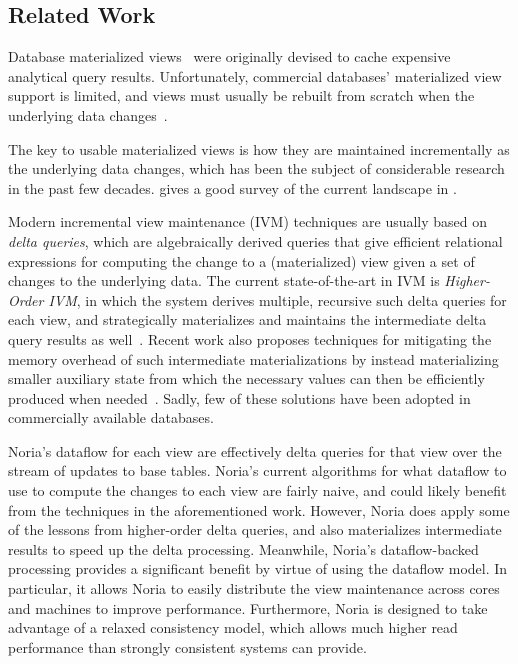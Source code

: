 \subsection*{Related Work}

Database materialized views~\cite{gupta-view-selection,lee} were originally
devised to cache expensive analytical query results. Unfortunately, commercial
databases' materialized view support is limited, and views must usually be
rebuilt from scratch when the underlying data
changes~\cite{materialized-view-selection-sql-server,mssql-materialized-view-restrictions-blog,
mssql-materialized-view-restrictions}.

The key to usable materialized views is how they are maintained incrementally as
the underlying data changes, which has been the subject of considerable research
in the past few decades. \citeauthor{materialized-survey} gives a good survey of
the current landscape in \cite{materialized-survey}.

Modern incremental view maintenance (IVM) techniques are usually based on
\textit{delta queries}, which are algebraically derived queries that give
efficient relational expressions for computing the change to a (materialized)
view given a set of changes to the underlying data. The current state-of-the-art
in IVM is \textit{Higher-Order IVM}, in which the system derives multiple,
recursive such delta queries for each view, and strategically materializes and
maintains the intermediate delta query results as well~\cite{dbtoaster, hotdog}.
Recent work also proposes techniques for mitigating the memory overhead of such
intermediate materializations by instead materializing smaller auxiliary state
from which the necessary values can then be efficiently produced when
needed~\cite{memory-efficient}. Sadly, few of these solutions have been adopted
in commercially available databases.

Noria's dataflow for each view are effectively delta queries for that view over
the stream of updates to base tables. Noria's current algorithms for what
dataflow to use to compute the changes to each view are fairly naive, and could
likely benefit from the techniques in the aforementioned work. However, Noria
does apply some of the lessons from higher-order delta queries, and also
materializes intermediate results to speed up the delta processing. Meanwhile,
Noria's dataflow-backed processing provides a significant benefit by virtue of
using the dataflow model. In particular, it allows Noria to easily distribute
the view maintenance across cores and machines to improve performance.
Furthermore, Noria is designed to take advantage of a relaxed consistency model,
which allows much higher read performance than strongly consistent systems can
provide.

